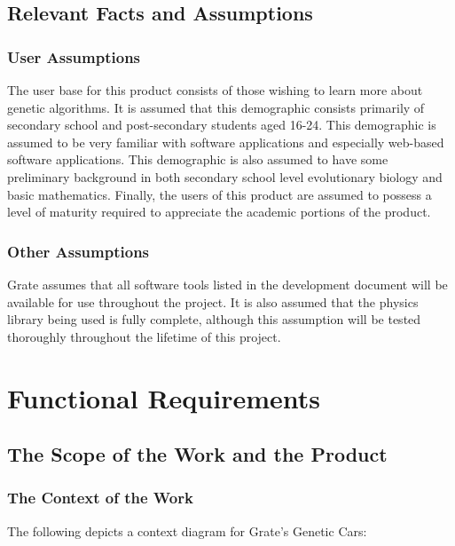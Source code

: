 \documentclass[12pt, titlepage]{article}
\begin{document}
\subsection{Relevant Facts and Assumptions}

\subsubsection{User Assumptions}

The user base for this product consists of those wishing to learn more about 
genetic algorithms. It is assumed that this demographic consists primarily of 
secondary school and post-secondary students aged 16-24. This demographic is 
assumed to be very familiar with software applications and especially web-based 
software applications. This demographic is also assumed to have some preliminary 
background in both secondary school level evolutionary biology and basic 
mathematics. Finally, the users of this product are assumed to possess a level 
of maturity required to appreciate the academic portions of the product.

\subsubsection{Other Assumptions}

Grate assumes that all software tools listed in the development document will be 
available for use throughout the project. It is also assumed that the physics 
library being used is fully complete, although this assumption will be tested 
thoroughly throughout the lifetime of this project.

\section{Functional Requirements}

\subsection{The Scope of the Work and the Product}

\subsubsection{The Context of the Work}
The following depicts a context diagram for Grate's Genetic Cars:
\end{document}

